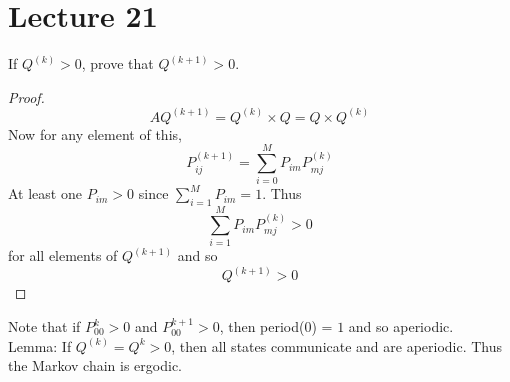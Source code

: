 \documentclass[12pt]{article}
\begin{document}
\section{Lecture 21} 
If $Q^{(k)} > 0$, prove that $Q^{(k+1)} > 0$. 
\begin{proof} $$ AQ^{(k+1)} = Q^{(k)} \times Q = Q \times Q^{(k)} $$ Now for any element of this, $$ P_{ij}^{(k+1)} = \sum_{i=0}^M P_{im}P_{mj}^{(k)}$$ 
At least one $P_{im} >0$ since $\sum_{i=1}^M P_{im} =1$. Thus $$ \sum_{i=1}^M P_{im}P_{mj}^{(k)} > 0 $$ for all elements of $Q^{(k+1)}$ and so $$Q^{(k+1)} > 0$$ \end{proof} 
Note that if $P_{00}^{k}>0$ and $P_{00}^{k+1}>0$, then period($0$) = $1$ and so aperiodic. \\
Lemma: If $Q^{(k)} = Q^k > 0$, then all states communicate and are aperiodic. Thus the Markov chain is ergodic. \\~\\
\end{document}
